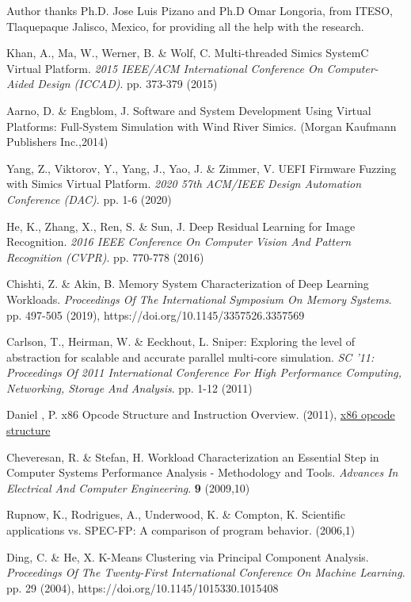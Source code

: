 \documentclass[]{PhDEngScITESO-R}
\begin{document}
Author thanks Ph.D. Jose Luis Pizano and Ph.D Omar Longoria, from ITESO, Tlaquepaque Jalisco, Mexico, for providing all the help with the research.

\begin{thebibliography}{9}

Khan, A., Ma, W., Werner, B. \& Wolf, C. Multi-threaded Simics SystemC Virtual Platform. {\em 2015 IEEE/ACM International Conference On Computer-Aided Design (ICCAD)}. pp. 373-379 (2015)

Aarno, D. \& Engblom, J. Software and System Development Using Virtual Platforms: Full-System Simulation with Wind River Simics. (Morgan Kaufmann Publishers Inc.,2014)

Yang, Z., Viktorov, Y., Yang, J., Yao, J. \& Zimmer, V. UEFI Firmware Fuzzing with Simics Virtual Platform. {\em 2020 57th ACM/IEEE Design Automation Conference (DAC)}. pp. 1-6 (2020)

He, K., Zhang, X., Ren, S. \& Sun, J. Deep Residual Learning for Image Recognition. {\em 2016 IEEE Conference On Computer Vision And Pattern Recognition (CVPR)}. pp. 770-778 (2016)

Chishti, Z. \& Akin, B. Memory System Characterization of Deep Learning Workloads. {\em Proceedings Of The International Symposium On Memory Systems}. pp. 497-505 (2019), https://doi.org/10.1145/3357526.3357569

Carlson, T., Heirman, W. \& Eeckhout, L. Sniper: Exploring the level of abstraction for scalable and accurate parallel multi-core simulation. {\em SC '11: Proceedings Of 2011 International Conference For High Performance Computing, Networking, Storage And Analysis}. pp. 1-12 (2011)

Daniel , P. x86 Opcode Structure and Instruction Overview.  (2011), 
\href{https://pnx.tf/files/x86_opcode_structure_and_instruction_overview.png}{x86 opcode structure}

Cheveresan, R. \& Stefan, H. Workload Characterization an Essential Step in Computer Systems Performance Analysis - Methodology and Tools. {\em Advances In Electrical And Computer Engineering}. \textbf{9} (2009,10)

Rupnow, K., Rodrigues, A., Underwood, K. \& Compton, K. Scientific applications vs. SPEC-FP: A comparison of program behavior.  (2006,1)

Ding, C. \& He, X. K-Means Clustering via Principal Component Analysis. {\em Proceedings Of The Twenty-First International Conference On Machine Learning}. pp. 29 (2004), https://doi.org/10.1145/1015330.1015408


\end{thebibliography}
\end{document}
